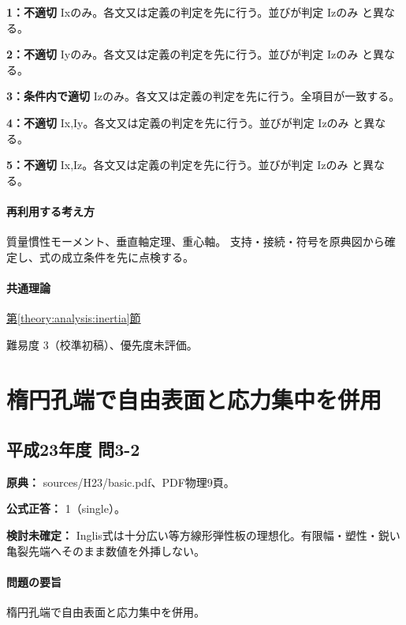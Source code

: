 \noindent\textbf{1：不適切} Ixのみ。各文又は定義の判定を先に行う。並びが判定 Izのみ と異なる。\par

\noindent\textbf{2：不適切} Iyのみ。各文又は定義の判定を先に行う。並びが判定 Izのみ と異なる。\par

\noindent\textbf{3：条件内で適切} Izのみ。各文又は定義の判定を先に行う。全項目が一致する。\par

\noindent\textbf{4：不適切} Ix,Iy。各文又は定義の判定を先に行う。並びが判定 Izのみ と異なる。\par

\noindent\textbf{5：不適切} Ix,Iz。各文又は定義の判定を先に行う。並びが判定 Izのみ と異なる。\par

\paragraph{再利用する考え方} 質量慣性モーメント、垂直軸定理、重心軸。 支持・接続・符号を原典図から確定し、式の成立条件を先に点検する。

\paragraph{共通理論} \hyperref[theory:analysis:inertia]{第\ref*{theory:analysis:inertia}節}

\par 難易度 3（校準初稿）、優先度未評価。

\section{楕円孔端で自由表面と応力集中を併用}

\subsection{平成23年度 問3-2}
\label{q:h23-reg-basic-3-2}

\noindent\textbf{原典：} sources/H23/basic.pdf、PDF物理9頁。

\textbf{公式正答：} 1（single）。

\par\textbf{検討未確定：} Inglis式は十分広い等方線形弾性板の理想化。有限幅・塑性・鋭い亀裂先端へそのまま数値を外挿しない。

\paragraph{問題の要旨} 楕円孔端で自由表面と応力集中を併用。

